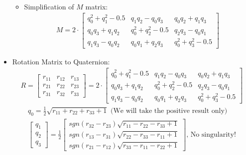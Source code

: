 \documentclass{article}
\begin{document}
\begin{itemize}
\begin{itemize}
\begin{gather*}
        \end{gather*}
        \item Simplification of $M$ matrix:
        \begin{gather*}
            M = 2\cdot
            \begin{bmatrix}
            q^2_0 + q^2_1 -0.5 & q_1q_2-q_0q_3 & q_0q_2+q_1q_3  \\
            q_0q_3 + q_1q_2 & q^2_0 + q^2_2 - 0.5 & q_2q_3-q_0q_1 \\
            q_1q_3-q_0q_2 & q_0q_1+q_2q_3 & q^2_0 + q^2_3 - 0.5
            \end{bmatrix}
        \end{gather*}
    \end{itemize}
    \item Rotation Matrix to Quaternion:
    \begin{gather*}
            R = 
        \begin{bmatrix}
            r_{11} & r_{12} & r_{13} \\
            r_{21} & r_{22} & r_{23} \\
            r_{31} & r_{32} & r_{33}
        \end{bmatrix} = 2\cdot
        \begin{bmatrix}
            q^2_0 + q^2_1 -0.5 & q_1q_2-q_0q_3 & q_0q_2+q_1q_3  \\
            q_0q_3 + q_1q_2 & q^2_0 + q^2_2 - 0.5 & q_2q_3-q_0q_1 \\
            q_1q_3-q_0q_2 & q_0q_1+q_2q_3 & q^2_0 + q^2_3 - 0.5
        \end{bmatrix}
    \end{gather*}
    \begin{gather*}
        q_0 = \frac{1}{2}\sqrt{r_{11}+r_{22}+r_{33}+1} \textrm{ (We will take the positive result only)}\\
        \begin{bmatrix}
        q_1\\
        q_2\\
        q_3
        \end{bmatrix}
        =\frac{1}{2}
        \begin{bmatrix}
        sgn(r_{32}-r_{23})\sqrt{r_{11}-r_{22}-r_{33} + 1}\\
        sgn(r_{13}-r_{31})\sqrt{r_{22}-r_{33}-r_{11} + 1}\\
        sgn(r_{21}-r_{12})\sqrt{r_{33}-r_{11}-r_{22} + 1}
        \end{bmatrix}
        \textrm{, No singularity!}

\end{gather*}
\end{itemize}
\end{document}
